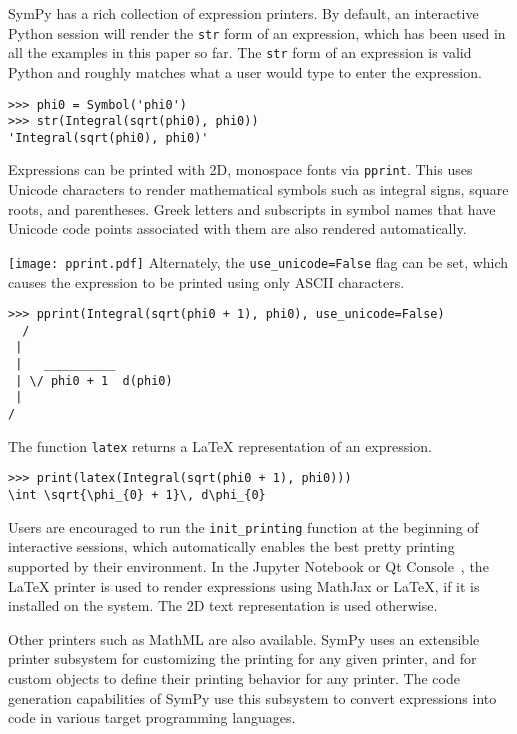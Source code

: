 SymPy has a rich collection of expression printers.
By default, an interactive Python session will render the
\verb|str| form of an expression, which has been used in all the examples in
this paper so far. The \verb|str| form of an expression is valid Python and
roughly matches what a user would type to enter the expression.

\begin{verbatim}
>>> phi0 = Symbol('phi0')
>>> str(Integral(sqrt(phi0), phi0))
'Integral(sqrt(phi0), phi0)'
\end{verbatim}

Expressions can be printed with 2D, monospace fonts via \verb|pprint|. This
uses Unicode characters to render mathematical symbols such as integral signs,
square roots, and parentheses. Greek letters and subscripts in symbol names
that have Unicode code points associated with them
are also rendered automatically.

\noindent
\texttt{[image: pprint.pdf]}
Alternately, the \verb|use_unicode=False| flag can be set, which causes the
expression to be printed using only ASCII characters.

\begin{verbatim}
>>> pprint(Integral(sqrt(phi0 + 1), phi0), use_unicode=False)
  /
 |
 |   __________
 | \/ phi0 + 1  d(phi0)
 |
/
\end{verbatim}

The function \verb|latex| returns a \LaTeX{} representation of an expression.

\begin{verbatim}
>>> print(latex(Integral(sqrt(phi0 + 1), phi0)))
\int \sqrt{\phi_{0} + 1}\, d\phi_{0}
\end{verbatim}

Users are encouraged to run the \verb|init_printing| function at the beginning
of interactive sessions, which automatically enables the best pretty printing
supported by their environment. In the Jupyter Notebook or Qt
Console~\cite{perez2007ipython}, the \LaTeX{} printer is used to render
expressions using MathJax or \LaTeX{}, if it is installed on the system. The
2D text representation is used otherwise.

Other printers such as MathML are also available. SymPy uses an extensible
printer subsystem for customizing the printing for any given
printer, and for custom objects to define their printing behavior for any
printer. The code generation capabilities of SymPy
use this subsystem to convert expressions into code in various target
programming languages.

